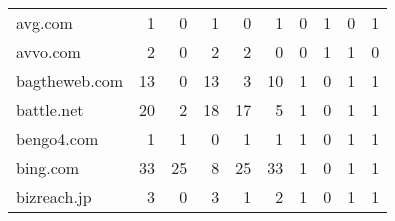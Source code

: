 \begin{tabular}{lrrrrrrrrr}
                    avg.com &                                1 &                                  0 &                                      1 &                            0 &                           1 &                                   0 &                                      1 &                             0 &                            1 \\
                   avvo.com &                                2 &                                  0 &                                      2 &                            2 &                           0 &                                   0 &                                      1 &                             1 &                            0 \\
              bagtheweb.com &                               13 &                                  0 &                                     13 &                            3 &                          10 &                                   1 &                                      0 &                             1 &                            1 \\
                 battle.net &                               20 &                                  2 &                                     18 &                           17 &                           5 &                                   1 &                                      0 &                             1 &                            1 \\
                 bengo4.com &                                1 &                                  1 &                                      0 &                            1 &                           1 &                                   1 &                                      0 &                             1 &                            1 \\
                   bing.com &                               33 &                                 25 &                                      8 &                           25 &                          33 &                                   1 &                                      0 &                             1 &                            1 \\
                bizreach.jp &                                3 &                                  0 &                                      3 &                            1 &                           2 &                                   1 &                                      0 &                             1 &                            1 \\

\end{tabular}
